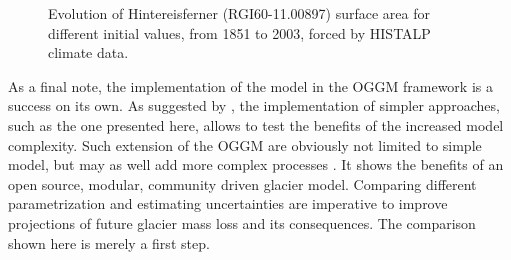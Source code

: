 \begin{figure}[ht]
      \caption{Evolution of Hintereisferner (RGI60-11.00897) surface area for different initial values, from 1851 to 2003, forced by HISTALP climate data.}
      \label{fig:start_area}
    \end{figure}

    As a final note, the implementation of the \vas{} model in the OGGM framework is a success on its own. As suggested by \citet{Maussion2019}, the implementation of simpler approaches, such as the one presented here, allows to test the benefits of the increased model complexity. Such extension of the OGGM are obviously not limited to simple model, but may as well add more complex processes \citep[e.g., an improved calving parametrization,][]{Recinos2019}. It shows the benefits of an open source, modular, community driven glacier model. Comparing different parametrization and estimating uncertainties are imperative to improve projections of future glacier mass loss and its consequences. The comparison shown here is merely a first step.

